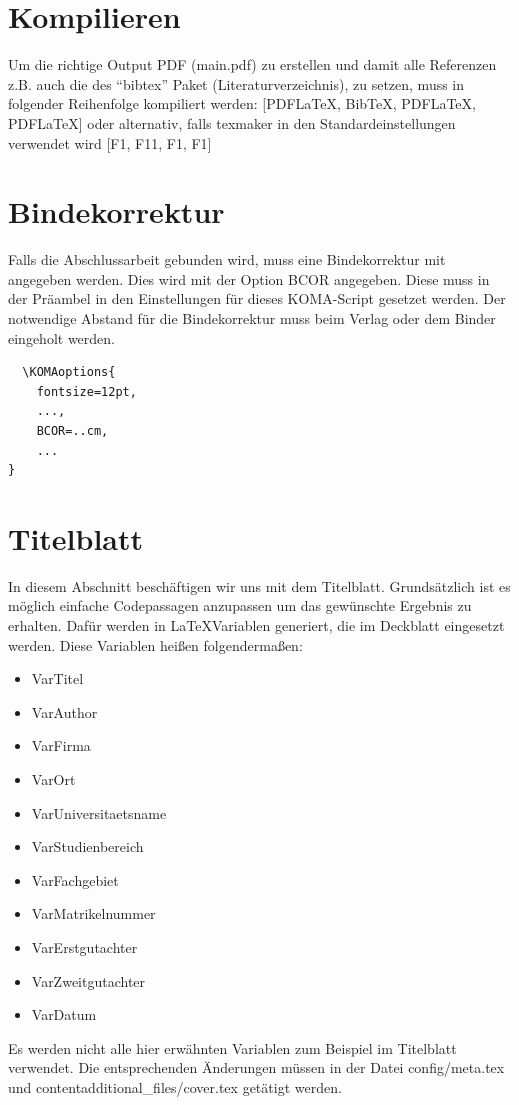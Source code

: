	\section{Kompilieren}
		\label{sec:kompilieren}
		Um die richtige Output PDF (main.pdf) zu erstellen und damit alle Referenzen z.B. auch die des \enquote{bibtex} Paket (Literaturverzeichnis), zu setzen, muss in folgender Reihenfolge kompiliert werden: [PDFLaTeX, BibTeX, PDFLaTeX, PDFLaTeX] oder alternativ, falls texmaker in den Standardeinstellungen verwendet wird [F1, F11, F1, F1]
		
	\section{Bindekorrektur}
		\label{sec:bindekorrektur}
		Falls die Abschlussarbeit gebunden wird, muss eine Bindekorrektur mit angegeben werden. Dies wird mit der Option BCOR angegeben. Diese muss in der Präambel in den Einstellungen für dieses KOMA-Script gesetzet werden. Der notwendige Abstand für die Bindekorrektur muss beim Verlag oder dem Binder eingeholt werden.
		
\begin{lstlisting}[style=texlisting, caption={Bindekorrektur angeben}, label={lst:bindekorrektur}]
% KOMA Options
  \KOMAoptions{
    fontsize=12pt,
    ...,
    BCOR=..cm,
    ...
}
\end{lstlisting}
	
	\section{Titelblatt}
		\label{sec:titelblatt}
		In diesem Abschnitt beschäftigen wir uns mit dem Titelblatt. Grundsätzlich ist es möglich einfache Codepassagen anzupassen um das gewünschte Ergebnis zu erhalten. 
		Dafür werden in \LaTeX Variablen generiert, die im Deckblatt eingesetzt werden.
		Diese Variablen heißen folgendermaßen:
		\begin{itemize}[noitemsep]
			\item VarTitel
			\item VarAuthor
			\item VarFirma
			\item VarOrt
			\item VarUniversitaetsname
			\item VarStudienbereich
			\item VarFachgebiet
			\item VarMatrikelnummer
			\item VarErstgutachter
			\item VarZweitgutachter
			\item VarDatum
		\end{itemize}
		Es werden nicht alle hier erwähnten Variablen zum Beispiel im Titelblatt verwendet. Die entsprechenden Änderungen müssen in der Datei config/meta.tex und contentadditional\_files/cover.tex getätigt werden.

